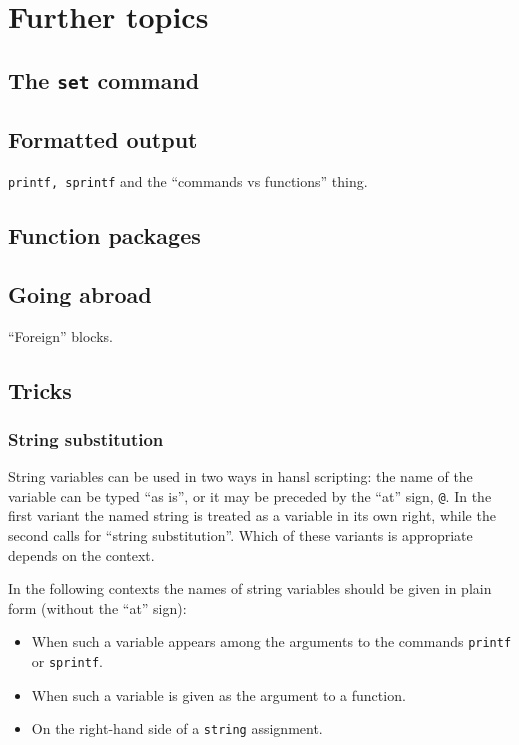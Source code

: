 \part{Further topics}

\chapter{The \texttt{set} command}
\label{chap:settings}

\chapter{Formatted output}

\texttt{printf, sprintf} and the ``commands vs functions'' thing.

\chapter{Function packages}

\chapter{Going abroad}
``Foreign'' blocks.

\chapter{Tricks}
\section{String substitution}
\label{sec:stringsub}

String variables can be used in two ways in hansl scripting: the name
of the variable can be typed ``as is'', or it may be preceded by the
``at'' sign, \verb|@|. In the first variant the named string is
treated as a variable in its own right, while the second calls for
``string substitution''. Which of these variants is appropriate
depends on the context.

In the following contexts the names of string variables should be
given in plain form (without the ``at'' sign):

\begin{itemize}
\item When such a variable appears among the arguments to the
  commands \texttt{printf} or \texttt{sprintf}.
\item When such a variable is given as the argument to a function.
\item On the right-hand side of a \texttt{string} assignment.
\end{itemize}

